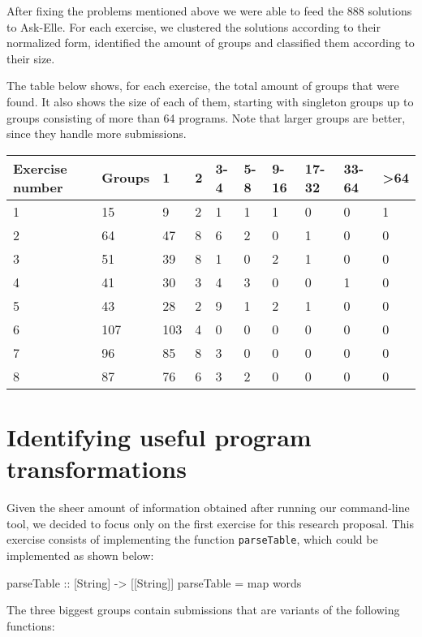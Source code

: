 \documentclass[a4paperpaper,]{report}
\newenvironment{Shaded}{}{}
\newcommand{\DataTypeTok}[1]{\textcolor[rgb]{0.56,0.13,0.00}{#1}}
\newcommand{\OtherTok}[1]{\textcolor[rgb]{0.00,0.44,0.13}{#1}}
\newcommand{\FunctionTok}[1]{\textcolor[rgb]{0.02,0.16,0.49}{#1}}
\newcommand{\NormalTok}[1]{#1}
\begin{document}
After fixing the problems mentioned above we were able to feed the 888
solutions to Ask-Elle. For each exercise, we clustered the solutions
according to their normalized form, identified the amount of groups and
classified them according to their size.

The table below shows, for each exercise, the total amount of groups
that were found. It also shows the size of each of them, starting with
singleton groups up to groups consisting of more than 64 programs. Note
that larger groups are better, since they handle more submissions.

\begin{longtable}[]{@{}llllllllll@{}}
\toprule
Exercise number & Groups & 1 & 2 & 3-4 & 5-8 & 9-16 & 17-32 & 33-64 &
\textgreater{}64\tabularnewline
\midrule
\endhead
1 & 15 & 9 & 2 & 1 & 1 & 1 & 0 & 0 & 1\tabularnewline
2 & 64 & 47 & 8 & 6 & 2 & 0 & 1 & 0 & 0\tabularnewline
3 & 51 & 39 & 8 & 1 & 0 & 2 & 1 & 0 & 0\tabularnewline
4 & 41 & 30 & 3 & 4 & 3 & 0 & 0 & 1 & 0\tabularnewline
5 & 43 & 28 & 2 & 9 & 1 & 2 & 1 & 0 & 0\tabularnewline
6 & 107 & 103 & 4 & 0 & 0 & 0 & 0 & 0 & 0\tabularnewline
7 & 96 & 85 & 8 & 3 & 0 & 0 & 0 & 0 & 0\tabularnewline
8 & 87 & 76 & 6 & 3 & 2 & 0 & 0 & 0 & 0\tabularnewline
\bottomrule
\end{longtable}

\hypertarget{identifying-useful-program-transformations}{%
\section{Identifying useful program
transformations}\label{identifying-useful-program-transformations}}

Given the sheer amount of information obtained after running our
command-line tool, we decided to focus only on the first exercise for
this research proposal. This exercise consists of implementing the
function \texttt{parseTable}, which could be implemented as shown below:

\begin{Shaded}
\begin{Highlighting}[]
\OtherTok{parseTable ::}\NormalTok{ [}\DataTypeTok{String}\NormalTok{] }\OtherTok{->}\NormalTok{ [[}\DataTypeTok{String}\NormalTok{]]}
\NormalTok{parseTable }\FunctionTok{=}\NormalTok{ map words}
\end{Highlighting}
\end{Shaded}

The three biggest groups contain submissions that are variants of the
following functions:
\end{document}
